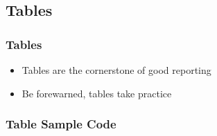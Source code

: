 \documentclass{beamer}
\begin{document}
\subsection{Tables}
\begin{frame}
  \frametitle{Tables}
  \begin{itemize}
  \item Tables are the cornerstone of good reporting
  \item Be forewarned, tables take practice
  \end{itemize}
  
\end{frame}

\begin{frame}
  \frametitle{Table Sample Code}  
    
\end{frame}
\end{document}
